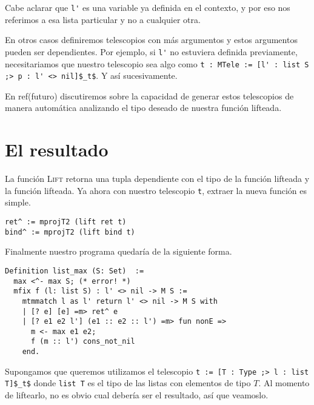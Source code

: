 Cabe aclarar que \lstinline{l'} es una variable ya definida en el contexto, y por eso nos referimos a esa lista particular y no a cualquier otra.

En otros casos definiremos telescopios con más argumentos y estos argumentos pueden ser dependientes. Por ejemplo, si \lstinline{l'} no estuviera definida previamente, necesitariamos que nuestro telescopio sea algo como  \lstinline{t : MTele := [l' : list S ;> p : l' <> nil]$_t$}. Y así sucesivamente.

En ref(futuro) discutiremos sobre la capacidad de generar estos telescopios de manera automática analizando el tipo deseado de nuestra función lifteada.

\section{El resultado}

La función \textsc{Lift} retorna una tupla dependiente con el tipo de la función lifteada y la función lifteada. Ya ahora con nuestro telescopio \lstinline{t}, extraer la nueva función es simple.

\begin{lstlisting}[float=h,frame=tb,caption={Lifteando \lstinline{ret} y \lstinline{bind}},label=lst:lift1]
ret^ := mprojT2 (lift ret t)
bind^ := mprojT2 (lift bind t)
\end{lstlisting}

Finalmente nuestro programa quedaría de la siguiente forma.

\begin{lstlisting}[float=h,frame=tb,caption={Lifteando \lstinline{ret} y \lstinline{bind}},label=lst:lift1]
Definition list_max (S: Set)  :=
  max <^- max S; (* error! *)
  mfix f (l: list S) : l' <> nil -> M S :=
    mtmmatch l as l' return l' <> nil -> M S with
    | [? e] [e] =m> ret^ e
    | [? e1 e2 l'] (e1 :: e2 :: l') =m> fun nonE =>
      m <- max e1 e2;
      f (m :: l') cons_not_nil
    end.
\end{lstlisting}

\iffalse
Supongamos que queremos utilizamos el telescopio \lstinline{t := [T : Type ;> l : list T]$_t$} donde \lstinline{list T} es el tipo de las listas con elementos de tipo $T$.
Al momento de liftearlo, no es obvio cual debería ser el resultado, así que veamoslo.

